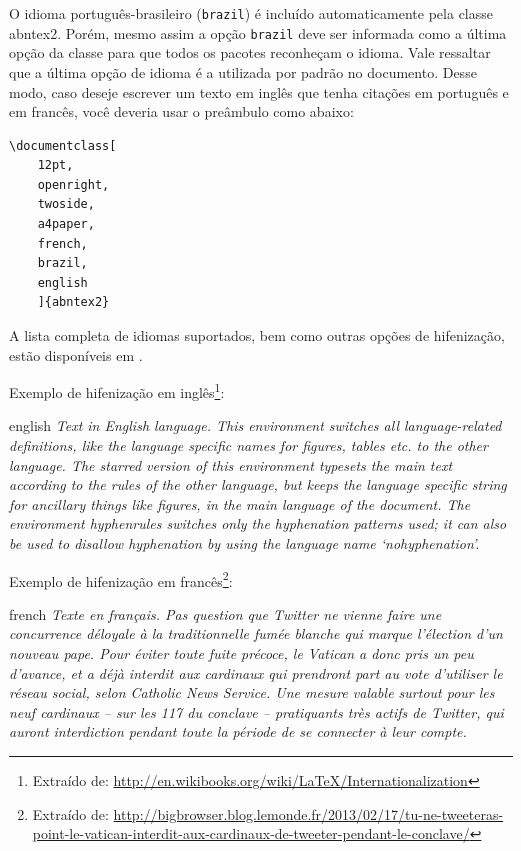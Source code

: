 O idioma português-brasileiro (\texttt{brazil}) é incluído automaticamente pela
classe \textsf{abntex2}. Porém, mesmo assim a opção \texttt{brazil} deve ser
informada como a última opção da classe para que todos os pacotes reconheçam o
idioma. Vale ressaltar que a última opção de idioma é a utilizada por padrão no
documento. Desse modo, caso deseje escrever um texto em inglês que tenha
citações em português e em francês, você deveria usar o preâmbulo como abaixo:

\begin{verbatim}
\documentclass[
	12pt,
	openright,
	twoside,
	a4paper,
	french,
	brazil,
	english
	]{abntex2}
\end{verbatim}

A lista completa de idiomas suportados, bem como outras opções de hifenização,
estão disponíveis em .

Exemplo de hifenização em inglês\footnote{Extraído de:
\url{http://en.wikibooks.org/wiki/LaTeX/Internationalization}}:

\begin{otherlanguage*}{english}
\textit{Text in English language. This environment switches all language-related
definitions, like the language specific names for figures, tables etc. to the other
language. The starred version of this environment typesets the main text
according to the rules of the other language, but keeps the language specific
string for ancillary things like figures, in the main language of the document.
The environment hyphenrules switches only the hyphenation patterns used; it can
also be used to disallow hyphenation by using the language name
`nohyphenation'.}
\end{otherlanguage*}

Exemplo de hifenização em francês\footnote{Extraído de:
\url{http://bigbrowser.blog.lemonde.fr/2013/02/17/tu-ne-tweeteras-point-le-vatican-interdit-aux-cardinaux-de-tweeter-pendant-le-conclave/}}:

\begin{otherlanguage*}{french}
\textit{Texte en français. Pas question que Twitter ne vienne faire une
concurrence déloyale à la traditionnelle fumée blanche qui marque l'élection
d'un nouveau pape. Pour éviter toute fuite précoce, le Vatican a donc pris un
peu d'avance, et a déjà interdit aux cardinaux qui prendront part au vote
d'utiliser le réseau social, selon Catholic News Service. Une mesure valable
surtout pour les neuf cardinaux – sur les 117 du conclave – pratiquants très
actifs de Twitter, qui auront interdiction pendant toute la période de se
connecter à leur compte.}
\end{otherlanguage*}

